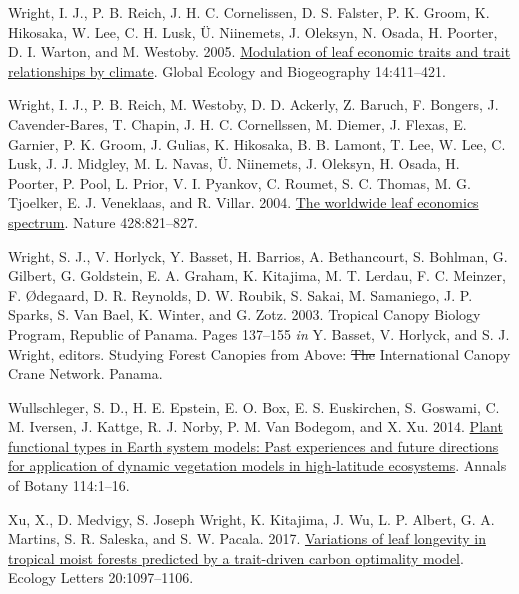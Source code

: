 \documentclass[
  12pt,
]{article}
\newlength{\cslhangindent} %
\newlength{\cslentryspacingunit} %
\newenvironment{CSLReferences}[2] %
 {%
  \setlength{\parindent}{0pt} %
  \ifodd #1 %
  \let\oldpar\par %
  \def\par{\hangindent=\cslhangindent\oldpar} %
  \fi %
  \setlength{\parskip}{#2\cslentryspacingunit} %
 }%
 {} %
\providecommand{\DIFaddtex}[1]{{\protect\color{blue}\uwave{#1}}} %
\providecommand{\DIFdeltex}[1]{{\protect\color{red}\sout{#1}}}                      %
\providecommand{\DIFaddbegin}{} %
\providecommand{\DIFaddend}{} %
\providecommand{\DIFdelbegin}{} %
\providecommand{\DIFdelend}{} %
\providecommand{\DIFadd}[1]{\texorpdfstring{\DIFaddtex{#1}}{#1}} %
\providecommand{\DIFdel}[1]{\texorpdfstring{\DIFdeltex{#1}}{}} %
\newcommand{\DIFscaledelfig}{0.5}
\newlength{\DIFdelgraphicswidth} %
\newlength{\DIFdelgraphicsheight} %
\newcommand{\DIFaddincludegraphics}[2][]{{\color{blue}\fbox{\DIFOincludegraphics[#1]{#2}}}} %
\newcommand{\DIFdelincludegraphics}[2][]{%
\sbox{\DIFdelgraphicsbox}{\DIFOincludegraphics[#1]{#2}}%
\settoboxwidth{\DIFdelgraphicswidth}{\DIFdelgraphicsbox} %
\settoboxtotalheight{\DIFdelgraphicsheight}{\DIFdelgraphicsbox} %
\scalebox{\DIFscaledelfig}{%
\parbox[b]{\DIFdelgraphicswidth}{\usebox{\DIFdelgraphicsbox}\\[-\baselineskip] \rule{\DIFdelgraphicswidth}{0em}}\llap{\resizebox{\DIFdelgraphicswidth}{\DIFdelgraphicsheight}{%
\setlength{\unitlength}{\DIFdelgraphicswidth}%
\begin{picture}(1,1)%
\thicklines\linethickness{2pt} %
{\color[rgb]{1,0,0}\put(0,0){\framebox(1,1){}}}%
{\color[rgb]{1,0,0}\put(0,0){\line( 1,1){1}}}%
{\color[rgb]{1,0,0}\put(0,1){\line(1,-1){1}}}%
\end{picture}%
}\hspace*{3pt}}} %
} %
\DeclareRobustCommand{\DIFaddbegin}{\DIFOaddbegin \let\includegraphics\DIFaddincludegraphics} %
\DeclareRobustCommand{\DIFaddend}{\DIFOaddend \let\includegraphics\DIFOincludegraphics} %
\DeclareRobustCommand{\DIFdelbegin}{\DIFOdelbegin \let\includegraphics\DIFdelincludegraphics} %
\DeclareRobustCommand{\DIFdelend}{\DIFOaddend \let\includegraphics\DIFOincludegraphics} %
\begin{document}
\begin{CSLReferences}{1}{0}
\leavevmode{}%
Wright, I. J., P. B. Reich, J. H. C. Cornelissen, D. S. Falster, P. K. Groom, K. Hikosaka, W. Lee, C. H. Lusk, Ü. Niinemets, J. Oleksyn, N. Osada, H. Poorter, D. I. Warton, and M. Westoby. 2005. \href{https://doi.org/10.1111/j.1466-822x.2005.00172.x}{Modulation of leaf economic traits and trait relationships by climate}. Global Ecology and Biogeography 14:411--421.

\leavevmode{}%
Wright, I. J., P. B. Reich, M. Westoby, D. D. Ackerly, Z. Baruch, F. Bongers, J. Cavender-Bares, T. Chapin, J. H. C. Cornellssen, M. Diemer, J. Flexas, E. Garnier, P. K. Groom, J. Gulias, K. Hikosaka, B. B. Lamont, T. Lee, W. Lee, C. Lusk, J. J. Midgley, M. L. Navas, Ü. Niinemets, J. Oleksyn, H. Osada, H. Poorter, P. Pool, L. Prior, V. I. Pyankov, C. Roumet, S. C. Thomas, M. G. Tjoelker, E. J. Veneklaas, and R. Villar. 2004. \href{https://doi.org/10.1038/nature02403}{The worldwide leaf economics spectrum}. Nature 428:821--827.

\leavevmode{}%
Wright, S. J., V. Horlyck, Y. Basset, H. Barrios, A. Bethancourt, S. Bohlman, G. Gilbert, G. Goldstein, E. A. Graham, K. Kitajima, M. T. Lerdau, F. C. Meinzer, F. Ødegaard, D. R. Reynolds, D. W. Roubik, S. Sakai, M. Samaniego, J. P. Sparks, S. Van Bael, K. Winter, and G. Zotz. 2003. Tropical {Canopy Biology Program}, {Republic} of {Panama}. Pages 137--155 \emph{in} Y. Basset, V. Horlyck, and S. J. Wright, editors. Studying {Forest Canopies} from {Above}: \DIFdelbegin %
\DIFdel{The }\DIFdelend \DIFaddbegin \DIFadd{The }{\DIFaddend International Canopy Crane Network}. {Panama}.

\leavevmode{}%
Wullschleger, S. D., H. E. Epstein, E. O. Box, E. S. Euskirchen, S. Goswami, C. M. Iversen, J. Kattge, R. J. Norby, P. M. Van Bodegom, and X. Xu. 2014. \href{https://doi.org/10.1093/aob/mcu077}{Plant functional types in {Earth} system models: \DIFdelbegin %
\DIFdelend Past \DIFdelbegin %
\DIFdelend experiences and future directions for application of dynamic vegetation models in high-latitude ecosystems}. Annals of Botany 114:1--16.

\leavevmode{}%
Xu, X., D. Medvigy, S. Joseph Wright, K. Kitajima, J. Wu, L. P. Albert, G. A. Martins, S. R. Saleska, and S. W. Pacala. 2017. \href{https://doi.org/10.1111/ele.12804}{Variations of leaf longevity in tropical moist forests predicted by a trait-driven carbon optimality model}. Ecology Letters 20:1097--1106.

\end{CSLReferences}
\end{document}
